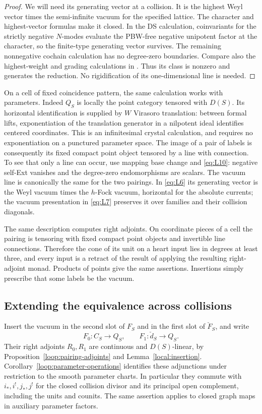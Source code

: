 \documentclass[11pt]{article}
\numberwithin{equation}{section}
\theoremstyle{definition}
\theoremstyle{remark}
\begin{document}
\begin{proof}
We will need its generating vector at a collision.  It is the
highest Weyl vector times the semi-infinite vacuum for the specified
lattice.  The character and highest-vector formulas make it closed.
In the DS calculation, coinvariants for the strictly negative
$N$-modes evaluate the PBW-free negative unipotent factor at the
character, so the finite-type generating vector survives.  The
remaining nonnegative cochain calculation has no degree-zero
boundaries.  Compare also the highest-weight and grading calculations in
\cite[Sections~4.1 and~4.3]{ArakawaFrenkel}.  Thus its class is nonzero and
generates the reduction.  No rigidification of its one-dimensional
line is needed.
\end{proof}

On a cell of fixed coincidence pattern, the same calculation works
with parameters.  Indeed $Q_S$ is locally the point category tensored
with $D(S)$.  Its horizontal identification is supplied by $W$
Virasoro translation: between formal lifts, exponentiation of the
translation generator in a nilpotent ideal identifies centered
coordinates.  This is an infinitesimal crystal calculation, and
requires no exponentiation on a punctured parameter space.
The image of a pair of labels is consequently its fixed compact
point object tensored by a line with connection.  To see that only
a line can occur, use mapping base change and \eqref{eq:L10}:
negative self-Ext vanishes and the degree-zero endomorphisms are
scalars.  The vacuum line is canonically the same for the two
pairings.  In \eqref{eq:L6} its generating vector is the Weyl
vacuum times the $h$-Fock vacuum, horizontal for the absolute
currents; the vacuum presentation in \eqref{eq:L7} preserves it
over families and their collision diagonals.

The same description computes right adjoints.  On coordinate
pieces of a cell the pairing is tensoring with fixed compact point
objects and invertible line connections.  Therefore the cone of
its unit on a heart input lies in degrees at least three, and
every input is a retract of the result of applying the resulting
right-adjoint monad.  Products of points give the same assertions.
Insertions simply prescribe that some labels be the vacuum.

\subsection{Extending the equivalence across collisions}

Insert the vacuum in the second slot of $F_S$ and in the first
slot of $\check F_S$, and write
\[
 F_0:C_S\longrightarrow Q_S,\qquad
 F_1:\check d_S\longrightarrow Q_S.
\]
Their right adjoints $R_0,R_1$ are continuous and $D(S)$-linear,
by Proposition~\ref{loop:pairing-adjoints} and
Lemma~\ref{local:insertion}.  Corollary~\ref{loop:parameter-operations}
identifies these adjunctions under restriction to the smooth parameter
charts.  In particular they commute with $i_*,i^!,j_*,j^!$ for the
closed collision divisor and its principal open complement, including
the units and counits.  The same assertion applies to closed graph
maps in auxiliary parameter factors.
\end{document}
